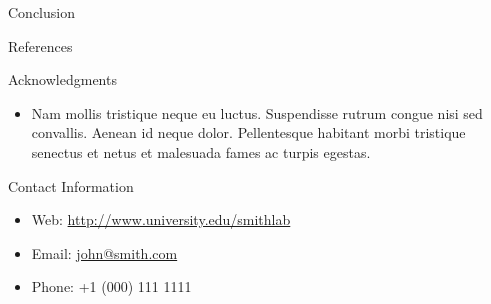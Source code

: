 \documentclass[final,hyperref={pdfpagelabels=false}]{beamer}
\begin{document}
\begin{frame}[t]
\begin{columns}[t]
\begin{column}{.465\textwidth}
\begin{block}{Conclusion}
\end{block}


\begin{block}{References}
        
\nocite{*} %
\small{
}

\end{block}


\begin{block}{Acknowledgments}

\begin{itemize}
\item Nam mollis tristique neque eu luctus. Suspendisse rutrum congue nisi sed convallis. Aenean id neque dolor. Pellentesque habitant morbi tristique senectus et netus et malesuada fames ac turpis egestas.
\end{itemize}

\end{block}



\begin{block}{Contact Information}

\begin{itemize}
\item Web: \href{http://www.university.edu/smithlab}{http://www.university.edu/smithlab}
\item Email: \href{mailto:john@smith.com}{john@smith.com}
\item Phone: +1 (000) 111 1111
\end{itemize}

\end{block}


\end{column} %

\begin{column}{.015\textwidth}\end{column} %

\end{columns} %

\end{frame} %
\end{document}
